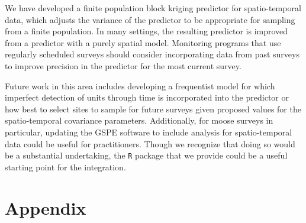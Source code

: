 \documentclass[]{interact}
\theoremstyle{plain}%
\theoremstyle{definition}
\theoremstyle{remark}
\begin{document}
We have developed a finite population block kriging predictor for
spatio-temporal data, which adjusts the variance of the predictor to be
appropriate for sampling from a finite population. In many settings, the
resulting predictor is improved from a predictor with a purely spatial
model. Monitoring programs that use regularly scheduled surveys should
consider incorporating data from past surveys to improve precision in
the predictor for the most current survey.

Future work in this area includes developing a frequentist model for
which imperfect detection of units through time is incorporated into the
predictor or how best to select sites to sample for future surveys given
proposed values for the spatio-temporal covariance parameters.
Additionally, for moose surveys in particular, updating the GSPE
software to include analysis for spatio-temporal data could be useful
for practitioners. Though we recognize that doing so would be a
substantial undertaking, the \texttt{R} package that we provide could be
a useful starting point for the integration.

\section{Appendix} \label{section:appendix}
\end{document}
